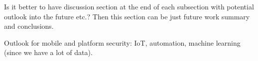 Is it better to have discussion section at the end of each subsection with potential outlook into the future etc.? 
Then this section can be just future work summary and conclusions. 

Outlook for mobile and platform security: IoT, automation, machine learning (since we have a lot of data).